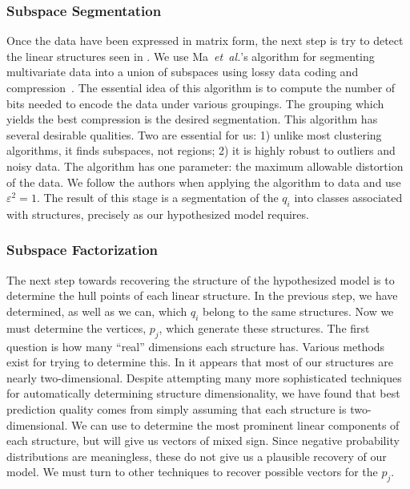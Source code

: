 \documentclass{acm_proc_article-sp}
\begin{document}
\vfill
\break
\vfill
\break

\subsubsection{Subspace Segmentation}

Once the data have been expressed in matrix form, the next step is try to detect the linear structures seen in .
We use Ma~\emph{et~al.}'s algorithm for segmenting multivariate data into a union of subspaces using lossy data coding and compression~\cite{Ma07}.
The essential idea of this algorithm is to compute the number of bits needed to encode the data under various groupings.
The grouping which yields the best compression is the desired segmentation.
This algorithm has several desirable qualities.
Two are essential for us:
1) unlike most clustering algorithms, it finds subspaces, not regions;
2) it is highly robust to outliers and noisy data.
The algorithm has one parameter:
the maximum allowable distortion of the data.
We follow the authors when applying the algorithm to  data and use $\varepsilon^2 = 1$.
The result of this stage is a segmentation of the $q_i$ into classes associated with structures, precisely as our hypothesized model requires.

\subsubsection{Subspace Factorization}


The next step towards recovering the structure of the hypothesized model is to determine the hull points of each linear structure.
In the previous step, we have determined, as well as we can, which $q_i$ belong to the same structures.
Now we must determine the vertices, $p_j$, which generate these structures.
The first question is how many ``real'' dimensions each structure has.
Various methods exist for trying to determine this.
In  it appears that most of our structures are nearly two-dimensional.
Despite attempting many more sophisticated techniques for automatically determining structure dimensionality, we have found that best prediction quality comes from simply assuming that each structure is two-dimensional.
We can use  to determine the most prominent linear components of each structure, but  will give us vectors of mixed sign.\svdnnnote
Since negative probability distributions are meaningless, these do not give us a plausible recovery of our model.
We must turn to other techniques to recover possible vectors for the $p_j$.
\end{document}
